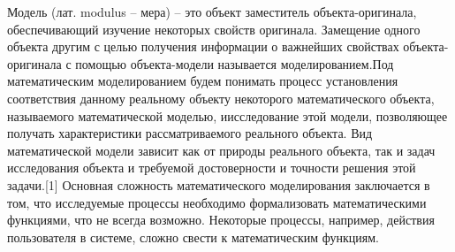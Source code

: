     Модель (лат. modulus – мера) – это объект заместитель объекта-оригинала, обеспечивающий изучение некоторых свойств оригинала. Замещение одного объекта другим с целью получения информации о важнейших свойствах объекта-оригинала с помощью объекта-модели называется моделированием.Под математическим моделированием будем понимать процесс установления соответствия данному реальному объекту некоторого математического объекта, называемого математической моделью, иисследование этой модели, позволяющее получать характеристики рассматриваемого реального объекта. Вид математической модели зависит как от природы реального объекта, так и задач исследования объекта и требуемой достоверности и точности решения этой задачи.[1] Основная сложность математического моделирования заключается в том, что исследуемые процессы необходимо формализовать математическими функциями, что не всегда возможно. Некоторые процессы, например, действия пользователя в системе, сложно свести к математическим функциям.
    

